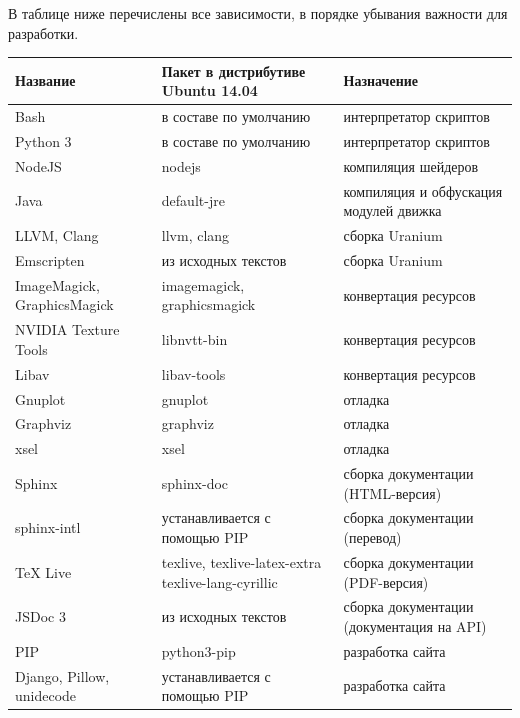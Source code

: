 \documentclass[a4paper,12pt,oneside]{sphinxmanual}
\begin{document}
В таблице ниже перечислены все зависимости, в порядке убывания важности для
разработки.

\begin{tabulary}{\linewidth}{|L|L|L|}
\hline
\textsf{\relax 
Название
} & \textsf{\relax 
Пакет в дистрибутиве Ubuntu
14.04
} & \textsf{\relax 
Назначение
}\\
\hline
Bash
 & 
в составе по умолчанию
 & 
интерпретатор скриптов
\\

Python 3
 & 
в составе по умолчанию
 & 
интерпретатор скриптов
\\

NodeJS
 & 
nodejs
 & 
компиляция шейдеров
\\

Java
 & 
default-jre
 & 
компиляция и обфускация
модулей движка
\\

LLVM, Clang
 & 
llvm, clang
 & 
сборка Uranium
\\

Emscripten
 & 
из исходных текстов
 & 
сборка Uranium
\\

ImageMagick, GraphicsMagick
 & 
imagemagick, graphicsmagick
 & 
конвертация ресурсов
\\

NVIDIA Texture Tools
 & 
libnvtt-bin
 & 
конвертация ресурсов
\\

Libav
 & 
libav-tools
 & 
конвертация ресурсов
\\

Gnuplot
 & 
gnuplot
 & 
отладка
\\

Graphviz
 & 
graphviz
 & 
отладка
\\

xsel
 & 
xsel
 & 
отладка
\\

Sphinx
 & 
sphinx-doc
 & 
сборка документации
(HTML-версия)
\\

sphinx-intl
 & 
устанавливается с помощью PIP
 & 
сборка документации
(перевод)
\\

TeX Live
 & 
texlive, texlive-latex-extra
texlive-lang-cyrillic
 & 
сборка документации
(PDF-версия)
\\

JSDoc 3
 & 
из исходных текстов
 & 
сборка документации
(документация на API)
\\

PIP
 & 
python3-pip
 & 
разработка сайта
\\

Django, Pillow, unidecode
 & 
устанавливается с помощью PIP
 & 
разработка сайта
\\
\hline\end{tabulary}
\end{document}
